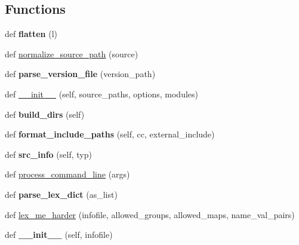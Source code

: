 \subsection*{Functions}
\begin{DoxyCompactItemize}
\item 
\mbox{\label{namespaceconfigure_a8e0f9891320c2b88490aa9b5674c4d6c}} 
def {\bfseries flatten} (l)
\item 
def \mbox{\hyperlink{namespaceconfigure_a60af6ffd74cbefc9b8125d9e0d94f003}{normalize\+\_\+source\+\_\+path}} (source)
\item 
\mbox{\label{namespaceconfigure_aea69e93060958e702d5d125fbd399fc2}} 
def {\bfseries parse\+\_\+version\+\_\+file} (version\+\_\+path)
\item 
def \mbox{\hyperlink{namespaceconfigure_a572a526cccb7574a72a8b283811706a1}{\+\_\+\+\_\+init\+\_\+\+\_\+}} (self, source\+\_\+paths, options, modules)
\item 
\mbox{\label{namespaceconfigure_ab2ba608092257925be1bf7bccde6cc0b}} 
def {\bfseries build\+\_\+dirs} (self)
\item 
\mbox{\label{namespaceconfigure_a9f56e3618a29640e2c31bf79dc49e825}} 
def {\bfseries format\+\_\+include\+\_\+paths} (self, cc, external\+\_\+include)
\item 
\mbox{\label{namespaceconfigure_a5f23e7a2c886517e11d02e6f2e4a77cd}} 
def {\bfseries src\+\_\+info} (self, typ)
\item 
def \mbox{\hyperlink{namespaceconfigure_a625fe15115495a28f82cad8a1f183d06}{process\+\_\+command\+\_\+line}} (args)
\item 
\mbox{\label{namespaceconfigure_a4ef33f1207d0b9c9833e06ff137f1dff}} 
def {\bfseries parse\+\_\+lex\+\_\+dict} (as\+\_\+list)
\item 
def \mbox{\hyperlink{namespaceconfigure_a177450ea125f9515fbb3e23b1cfb298f}{lex\+\_\+me\+\_\+harder}} (infofile, allowed\+\_\+groups, allowed\+\_\+maps, name\+\_\+val\+\_\+pairs)
\item 
\mbox{\label{namespaceconfigure_a3e9ce2898203241275183a3cbd8d2f1c}} 
def {\bfseries \+\_\+\+\_\+init\+\_\+\+\_\+} (self, infofile)

\end{DoxyCompactItemize}
